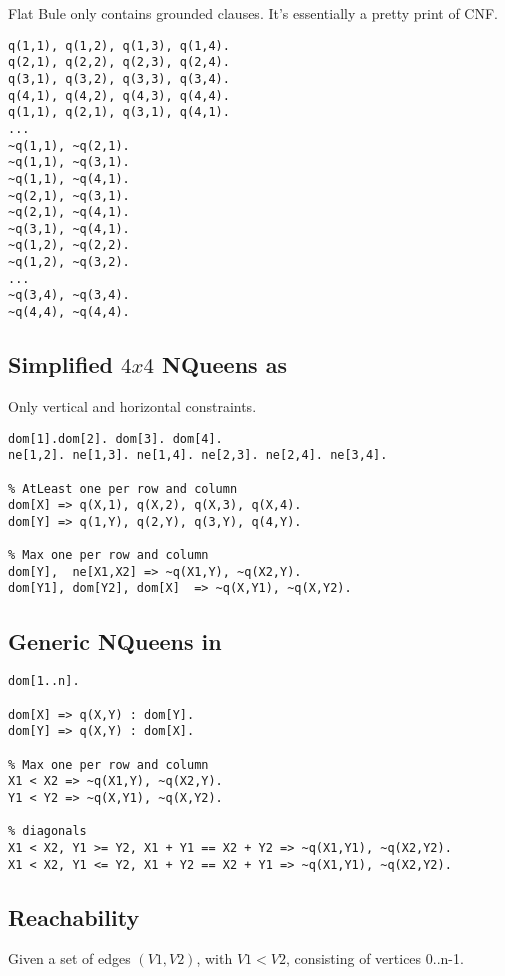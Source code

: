 \documentclass[conference]{IEEEtran}
\begin{document}
Flat Bule only contains grounded clauses. It's essentially a pretty print of CNF.

\begin{lstlisting}
q(1,1), q(1,2), q(1,3), q(1,4).
q(2,1), q(2,2), q(2,3), q(2,4).
q(3,1), q(3,2), q(3,3), q(3,4).
q(4,1), q(4,2), q(4,3), q(4,4).
q(1,1), q(2,1), q(3,1), q(4,1).
...
~q(1,1), ~q(2,1).
~q(1,1), ~q(3,1).
~q(1,1), ~q(4,1).
~q(2,1), ~q(3,1).
~q(2,1), ~q(4,1).
~q(3,1), ~q(4,1).
~q(1,2), ~q(2,2).
~q(1,2), ~q(3,2).
...
~q(3,4), ~q(3,4).
~q(4,4), ~q(4,4).
\end{lstlisting}

\subsection{Simplified $4x4$ NQueens as \bcore}

Only vertical and horizontal constraints.

\begin{lstlisting}
dom[1].dom[2]. dom[3]. dom[4]. 
ne[1,2]. ne[1,3]. ne[1,4]. ne[2,3]. ne[2,4]. ne[3,4].

% AtLeast one per row and column
dom[X] => q(X,1), q(X,2), q(X,3), q(X,4).
dom[Y] => q(1,Y), q(2,Y), q(3,Y), q(4,Y).

% Max one per row and column  
dom[Y],  ne[X1,X2] => ~q(X1,Y), ~q(X2,Y). 
dom[Y1], dom[Y2], dom[X]  => ~q(X,Y1), ~q(X,Y2). 
\end{lstlisting}

\subsection{Generic NQueens in \bfull}

\begin{lstlisting}
dom[1..n]. 

dom[X] => q(X,Y) : dom[Y]. 
dom[Y] => q(X,Y) : dom[X].

% Max one per row and column  
X1 < X2 => ~q(X1,Y), ~q(X2,Y). 
Y1 < Y2 => ~q(X,Y1), ~q(X,Y2). 

% diagonals
X1 < X2, Y1 >= Y2, X1 + Y1 == X2 + Y2 => ~q(X1,Y1), ~q(X2,Y2). 
X1 < X2, Y1 <= Y2, X1 + Y2 == X2 + Y1 => ~q(X1,Y1), ~q(X2,Y2). 
\end{lstlisting}

\subsection{Reachability}

Given a set of edges $(V1,V2)$, with $V1 < V2$, consisting of vertices 0..n-1. 
\end{document}
